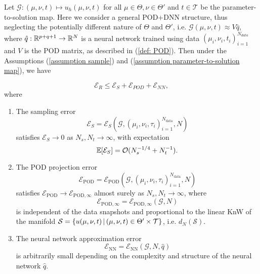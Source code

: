 \begin{theorem} \label{theo: relative error POD+DNN}
    Let $\mathcal{G}:(\mu, \nu, t) \mapsto u_h(\mu, \nu, t)$ for all $\mu \in \Theta, \nu \in \Theta'$ and $t \in \mathcal{T}$ be the parameter-to-solution map. Here we consider a general POD+DNN structure, thus neglecting the potentially different nature of $\Theta$ and $\Theta'$, i.e. $\mathcal{G}(\mu, \nu, t) \approx V \hat{q}$, where $\hat{q}: \mathbb{R}^{p+q+1} \to \mathbb{R}^N$ is a neural network trained using data $(\mu_i, \nu_i, t_i)_{i=1}^{N_{data}}$ and $V$ is the POD matrix, as described in (\ref{def: POD}). Then under the Assumptions (\ref{assumption sample}) and (\ref{assumption parameter-to-solution map}), we have
    
    \begin{equation}
        \mathcal{E}_R \leq \mathcal{E}_S + \mathcal{E}_{POD} + \mathcal{E}_{NN},
    \end{equation}
    where 
    
    \begin{enumerate}
        \item The sampling error 
        \[
            \mathcal{E}_S = \mathcal{E}_S\left(\mathcal{G}, (\mu_i, \nu_i, \tau_i)_{i = 1}^{N_{\text{data}}}, N\right)
        \]
        satisfies $\mathcal{E}_S \to 0$ as $N_s, N_t \to \infty$, with expectation 
        \[
            \mathbb{E}[\mathcal{E}_S] = \mathcal{O}(N_s^{-1/4} + N_t^{-1}).
        \]
    
        \item The POD projection error 
        \[
            \mathcal{E}_{\text{POD}} = \mathcal{E}_{\text{POD}}\left(\mathcal{G}, (\mu_i, \nu_i, \tau_i)_{i = 1}^{N_{\text{data}}}, N\right)
        \]
        satisfies $\mathcal{E}_{\text{POD}} \to \mathcal{E}_{\text{POD}, \infty}$ almost surely as $N_s, N_t \to \infty$, where
        \[
            \mathcal{E}_{\text{POD}, \infty} = \mathcal{E}_{\text{POD}, \infty}(\mathcal{G}, N)
        \]
        is independent of the data snapshots and proportional to the linear KnW of the manifold $\mathcal{S} = \{ u(\mu, \nu, t) \, \vert \, (\mu, \nu, t) \in \Theta' \times \mathcal{T} \}$, i.e. $d_N(\mathcal{S})$.
    
        \item The neural network approximation error
        \[
            \mathcal{E}_{\text{NN}} = \mathcal{E}_{\text{NN}}\left(\mathcal{G}, N, \hat{q}\right)
        \]
        is arbitrarily small depending on the complexity and structure of the neural network $\hat{q}$.
    \end{enumerate} 

\end{theorem}
